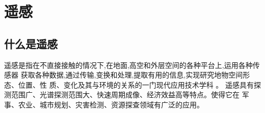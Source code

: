 
		\section{遥感}	
		\subsection{什么是遥感}
		\par 
		遥感是指在不直接接触的情况下,在地面,高空和外层空间的各种平台上,运用各种传感器
		获取各种数据,通过传输,变换和处理,提取有用的信息,实现研究地物空间形态、位置、性
		质、变化及其与环境的关系的一门现代应用技术学科\cite{孙家柄2009遥感原理与应用}
		。
		遥感具有探测范围广、光谱探测范围大、快速周期成像、经济效益高等特点。使得它在
		军事、农业、城市规划、灾害检测、资源探查领域有广泛的应用。

